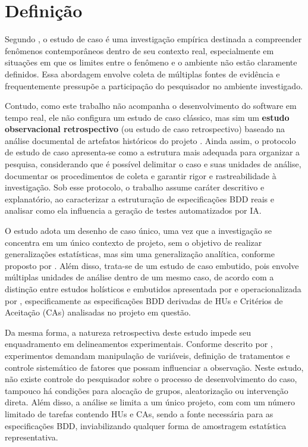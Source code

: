 \section{Definição}

Segundo , o estudo de caso é uma investigação empírica destinada a compreender fenômenos contemporâneos dentro de seu contexto real, especialmente em situações em que os limites entre o fenômeno e o ambiente não estão claramente definidos. Essa abordagem envolve coleta de múltiplas fontes de evidência e frequentemente pressupõe a participação do pesquisador no ambiente investigado.

Contudo, como este trabalho não acompanha o desenvolvimento do software em tempo real, ele não configura um estudo de caso clássico, mas sim um \textbf{estudo observacional retrospectivo} (ou estudo de caso retrospectivo) baseado na análise documental de artefatos históricos do projeto \cite{runeson2009}. Ainda assim, o protocolo de estudo de caso apresenta-se como a estrutura mais adequada para organizar a pesquisa, considerando que é possível delimitar o caso e suas unidades de análise, documentar os procedimentos de coleta e garantir rigor e rastreabilidade à investigação. Sob esse protocolo, o trabalho assume caráter descritivo e explanatório, ao caracterizar a estruturação de especificações BDD reais e analisar como ela influencia a geração de testes automatizados por IA.

O estudo adota um desenho de caso único, uma vez que a investigação se concentra em um único contexto de projeto, sem o objetivo de realizar generalizações estatísticas, mas sim uma generalização analítica, conforme proposto por . Além disso, trata-se de um estudo de caso embutido, pois envolve múltiplas unidades de análise dentro de um mesmo caso, de acordo com a distinção entre estudos holísticos e embutidos apresentada por  e operacionalizada por , especificamente as especificações BDD derivadas de HUs e Critérios de Aceitação (CAs) analisadas no projeto em questão.

Da mesma forma, a natureza retrospectiva deste estudo impede seu enquadramento em delineamentos experimentais. Conforme descrito por , experimentos demandam manipulação de variáveis, definição de tratamentos e controle sistemático de fatores que possam influenciar a observação. Neste estudo, não existe controle do pesquisador sobre o processo de desenvolvimento do caso, tampouco há condições para alocação de grupos, aleatorização ou intervenção direta. Além disso, a análise se limita a um único projeto, com com um número limitado de tarefas contendo HUs e CAs, sendo a fonte necessária para as especificações BDD, inviabilizando qualquer forma de amostragem estatística representativa.

